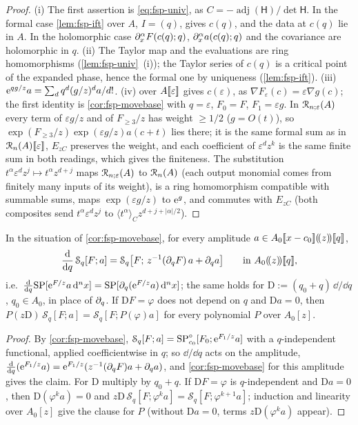 \begin{proof}
(i) The first assertion is \eqref{eq:fsp-univ}, as $C=-\operatorname{adj}(\mathsf H)/\det\mathsf H$. In the formal case \cref{lem:fsp-ift} over $A$, $I=(q)$, gives $c(q)$, and the data at $c(q)$ lie in $A$. In the holomorphic case $\partial_x^\alpha F(c(q);q)$, $\partial_x^\alpha a(c(q);q)$ and the covariance are holomorphic in $q$. (ii) The Taylor map and the evaluations are ring homomorphisms (\cref{lem:fsp-univ}~(i)); the Taylor series of $c(q)$ is a critical point of the expanded phase, hence the formal one by uniqueness (\cref{lem:fsp-ift}). (iii) $\mathrm{e}^{qg/z}a=\sum_dq^d(g/z)^da/d!$. (iv)  over $A[\![ \varepsilon ]\!]$ gives $c(\varepsilon)$, as $\nabla F_\varepsilon(c)=\varepsilon\nabla g(c)$; the first identity is \cref{cor:fsp-movebase} with $q=\varepsilon$, $F_0=F$, $F_1=\varepsilon g$. In $\mathcal{R}_{n;\varepsilon}(A)$ every term of $\varepsilon g/z$ and of $F_{\geq3}/z$ has weight $\geq1/2$ ($g=O(t)$), so $\exp(F_{\geq3}/z)\exp(\varepsilon g/z)a(c+t)$ lies there; it is the same formal sum as in $\mathcal{R}_n(A)[\![ \varepsilon ]\!]$, $E_{zC}$ preserves the weight, and each coefficient of $\varepsilon^dz^k$ is the same finite sum in both readings, which gives the finiteness. The substitution $t^\alpha\varepsilon^dz^j\mapsto t^\alpha z^{d+j}$ maps $\mathcal{R}_{n;\varepsilon}(A)$ to $\mathcal{R}_n(A)$ (each output monomial comes from finitely many inputs of its weight), is a ring homomorphism compatible with summable sums, maps $\exp(\varepsilon g/z)$ to $\mathrm{e}^g$, and commutes with $E_{zC}$ (both composites send $t^\alpha\varepsilon^dz^j$ to $\langle t^\alpha\rangle_Cz^{d+j+|\alpha|/2}$).
\end{proof}

\begin{lem}
\label{lem:fsp-dq}
In the situation of \cref{cor:fsp-movebase}, for every amplitude $a\in A_0[\![ x-c_0 ]\!](\!(z)\!)[\![ q ]\!]$,
\[
\frac{\mathrm{d}}{\mathrm{d} q}\,\mathcal S_q[F;a]=\mathcal S_q\bigl[F;\,z^{-1}(\partial_qF)\,a+\partial_qa\bigr]\qquad\text{in }A_0(\!(z)\!)[\![ q ]\!],
\]
i.e.\ $\frac{\mathrm{d}}{\mathrm{d} q}\mathrm{SP}[\mathrm{e}^{F/z}a\,\mathrm{d}^nx]=\mathrm{SP}[\partial_q(\mathrm{e}^{F/z}a)\,\mathrm{d}^nx]$; the same holds for $\mathrm D:=(q_0+q)\,\dd/\dd q$, $q_0\in A_0$, in place of $\partial_q$. If $\mathrm DF=\varphi$ does not depend on $q$ and $\mathrm Da=0$, then $P(z\mathrm D)\,\mathcal S_q[F;a]=\mathcal S_q[F;P(\varphi)a]$ for every polynomial $P$ over $A_0[z]$.
\end{lem}

\begin{proof}
By \cref{cor:fsp-movebase}, $\mathcal S_q[F;a]=\mathrm{SP}^{\circ}_{c_0}[F_0;\mathrm{e}^{F_1/z}a]$ with a $q$-independent functional, applied coefficientwise in $q$; so $\dd/\dd q$ acts on the amplitude, $\frac{\mathrm{d}}{\mathrm{d} q}(\mathrm{e}^{F_1/z}a)=\mathrm{e}^{F_1/z}(z^{-1}(\partial_qF)a+\partial_qa)$, and \cref{cor:fsp-movebase} for this amplitude gives the claim. For $\mathrm D$ multiply by $q_0+q$. If $\mathrm DF=\varphi$ is $q$-independent and $\mathrm Da=0$, then $\mathrm D(\varphi^ka)=0$ and $z\mathrm D\,\mathcal S_q[F;\varphi^ka]=\mathcal S_q[F;\varphi^{k+1}a]$; induction and linearity over $A_0[z]$ give the clause for $P$ (without $\mathrm Da=0$, terms $z\mathrm D(\varphi^ka)$ appear).
\end{proof}

